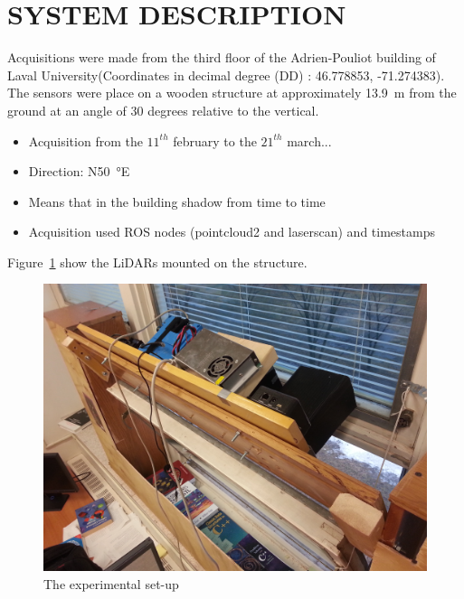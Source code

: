 \section{SYSTEM DESCRIPTION}

Acquisitions were made from the third floor of the Adrien-Pouliot building of Laval University(Coordinates in decimal degree (DD) : 46.778853, -71.274383). The sensors were place on a wooden structure at approximately \SI{13.9}{\meter} from the ground at an angle of 30 degrees relative to the vertical.
\begin{itemize}
    \item Acquisition from the $11^{th}$ february to the $21^{th}$ march...
    \item Direction: N\SI{50}{\degree}E
    \item Means that in the building shadow from time to time
    \item Acquisition used ROS nodes (pointcloud2 and laserscan) and timestamps
\end{itemize}

Figure~\ref{fig:setup} show the LiDARs mounted on the structure.

\begin{figure}[h]
    \centering
    \includegraphics[width=0.9\linewidth]{./img/setup_diag.jpg}
    \caption{The experimental set-up}
    \label{fig:setup}
\end{figure}


